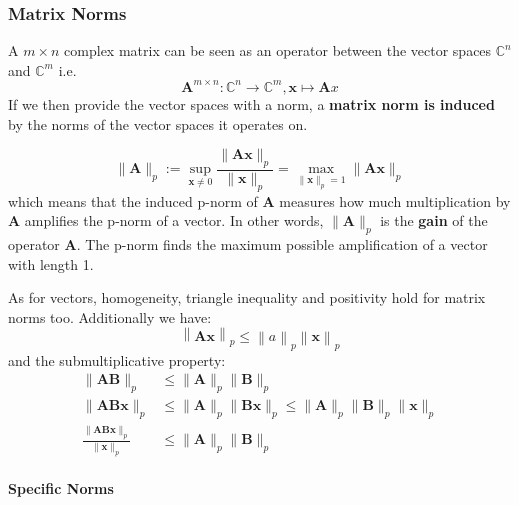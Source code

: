 \subsubsection{Matrix Norms}
A $m\times n$ complex matrix can be seen as an operator between the vector spaces $\mathbb{C}^n$ and $\mathbb{C}^m$ i.e.
\begin{equation*}
    \mathbf{A}^{m\times n}:\mathbb{C}^n\to\mathbb{C}^m,\mathbf{x}\mapsto \mathbf{A}x
\end{equation*}
If we then provide the vector spaces with a norm, a \textbf{matrix norm is induced} by the norms of the vector spaces it operates on.

\begin{equation*}
    \|\mathbf{A}\|_p:=\sup_{\mathbf{x}\neq0}\frac{\|\mathbf{Ax}\|_p}{\|\mathbf{x}\|_p}=\max_{\|\mathbf{x}\|_p=1}\|\mathbf{Ax}\|_p
\end{equation*}
which means that the induced p-norm of $\mathbf{A}$ measures how much multiplication by $\mathbf{A}$ amplifies the p-norm of a vector. In other words, $\|\mathbf{A}\|_p$ is the \textbf{gain} of the operator $\mathbf{A}$. The p-norm finds the maximum possible amplification of a vector with length 1.

\newpar{}

As for vectors, homogeneity, triangle inequality and positivity hold for matrix norms too. Additionally we have:
\begin{equation*}
    \left\|\mathbf{Ax}\right\|_p\leq\left\|a\right\|_p\left\|\mathbf{x}\right\|_p
\end{equation*}
and the submultiplicative property:
\begin{align*}
    \|\mathbf{AB}\|_p                                     & \leq\|\mathbf{A}\|_p\|\mathbf{B}\|_p                                                      \\
    \|\mathbf{AB} \mathbf{x}\|_p                          & \leq\|\mathbf{A}\|_p\|\mathbf{Bx}\|_p\leq\|\mathbf{A}\|_p\|\mathbf{B}\|_p\|\mathbf{x}\|_p \\
    \frac{\|\mathbf{AB} \mathbf{x}\|_p}{\|\mathbf{x}\|_p} & \leq\|\mathbf{A}\|_p\|\mathbf{B}\|_p
\end{align*}


\paragraph{Specific Norms}

